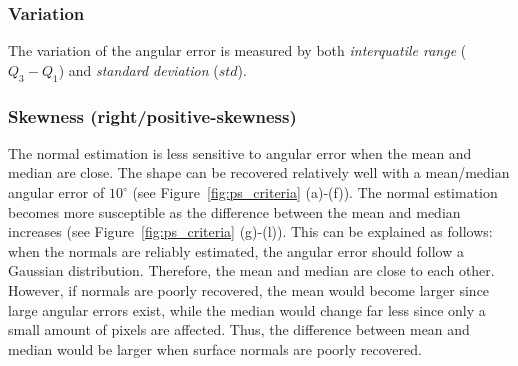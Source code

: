 \subsubsection{Variation}
The variation of the angular error is measured by both \textit{interquatile range} ($Q_3 - Q_1$) and \textit{standard deviation} ($std$).
  
\subsubsection{Skewness (right/positive-skewness)}
The normal estimation is less sensitive to angular error when the mean and median are close. The shape can be recovered relatively well with a mean/median angular error of $10^\circ$ (see Figure~\ref{fig:ps_criteria} (a)-(f)). The normal estimation becomes more susceptible as the difference between the mean and median increases (see Figure~\ref{fig:ps_criteria} (g)-(l)). This can be explained as follows: when the normals are reliably estimated, the angular error should follow a Gaussian distribution. Therefore, the mean and median are close to each other. However, if normals are poorly recovered, the mean would become larger since large angular errors exist, while the median would change far less since only a small amount of pixels are affected. Thus, the difference between mean and median would be larger when surface normals are poorly recovered.

